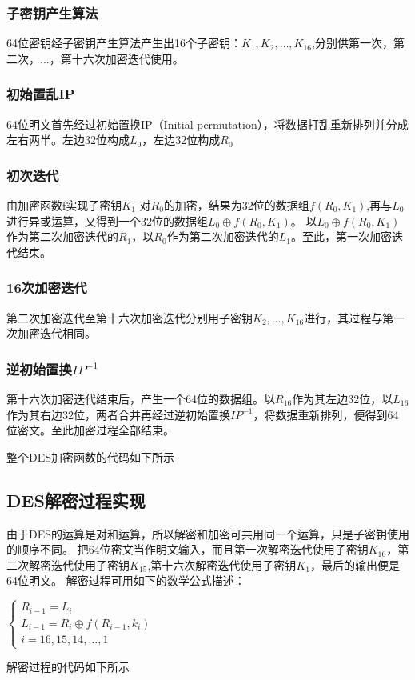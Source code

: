\documentclass[a4paper,11pt,UTF8]{ctexart}
\begin{document}
        \subsubsection{子密钥产生算法}
            64位密钥经子密钥产生算法产生出16个子密钥：$K_{1},K_{2},\ldots,K_{16}$,分别供第一次，第二次，...，第十六次加密迭代使用。
        \subsubsection{初始置乱IP}
            64位明文首先经过初始置换IP（Initial permutation），将数据打乱重新排列并分成左右两半。左边32位构成$L_{0}$，左边32位构成$R_{0}$
        \subsubsection{初次迭代}
            由加密函数f实现子密钥$K_{1}$ 对$R_{0}$的加密，结果为32位的数据组$f(R_{0},K_{1})$,再与$L_{0}$进行异或运算，又得到一个32位的数据组$L_{0}\oplus f(R_{0},K_{1})$。
            以$L_{0}\oplus f(R_{0},K_{1})$作为第二次加密迭代的$R_{1}$，以$R_{0}$作为第二次加密迭代的$L_{1}$。至此，第一次加密迭代结束。
        \subsubsection{16次加密迭代}
            第二次加密迭代至第十六次加密迭代分别用子密钥$K_{2},\ldots,K_{16}$进行，其过程与第一次加密迭代相同。
        \subsubsection{逆初始置换$IP^{-1} $}
            第十六次加密迭代结束后，产生一个64位的数据组。以$R_{16}$作为其左边32位，以$L_{16}$作为其右边32位，两者合并再经过逆初始置换$IP^{-1} $，将数据重新排列，便得到64位密文。至此加密过程全部结束。\par
\newpage
        整个DES加密函数的代码如下所示
        
\newpage
    \subsection{DES解密过程实现}
        由于DES的运算是对和运算，所以解密和加密可共用同一个运算，只是子密钥使用的顺序不同。
        把64位密文当作明文输入，而且第一次解密迭代使用子密钥$K_{16}$，第二次解密迭代使用子密钥$K_{15}$,第十六次解密迭代使用子密钥$K_{1}$，最后的输出便是64位明文。
        解密过程可用如下的数学公式描述：\par
        $\begin{cases}
            R_{i-1}=L_{i}\\ L_{i-1}=R_{i}\oplus f\left( R_{i-1},k_{i}\right) \\ i=16,15,14,\ldots ,1
        \end{cases}$\par
        解密过程的代码如下所示
        
\end{document}

